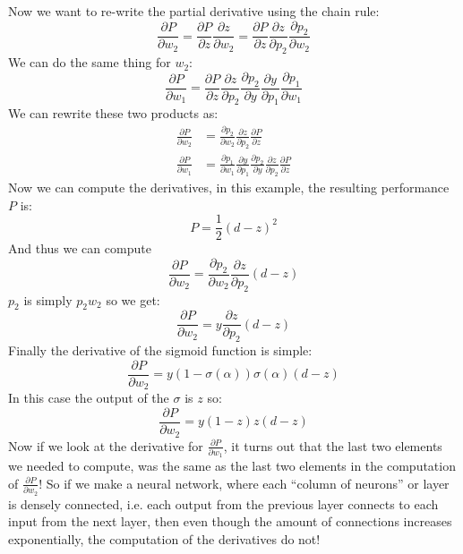     Now we want to re-write the partial derivative using the chain rule:
    \begin{equation*}
        \frac{\partial P}{\partial w_2} = \frac{\partial P}{\partial z} 
        \frac{\partial z}{\partial w_2} = \frac{\partial P}{\partial z} 
        \frac{\partial z}{\partial p_2} \frac{\partial p_2}{\partial w_2} 
    \end{equation*}
    We can do the same thing for $w_2$:
    \begin{equation*}
        \frac{\partial P}{\partial w_1} = \frac{\partial P}{\partial z} 
        \frac{\partial z}{\partial p_2} \frac{\partial p_2}{\partial y} 
        \frac{\partial y}{\partial p_1} \frac{\partial p_1}{\partial w_1} 
    \end{equation*}
    We can rewrite these two products as:
    \begin{align*}
        \frac{\partial P}{\partial w_2}&= \frac{\partial p_2}{\partial w_2} 
        \frac{\partial z}{\partial p_2} \frac{\partial P}{\partial z}\\
        \frac{\partial P}{\partial w_1}&=\frac{\partial p_1}{\partial w_1} 
        \frac{\partial y}{\partial p_1} \frac{\partial p_2}{\partial y} 
        \frac{\partial z}{\partial p_2} \frac{\partial P}{\partial z}
    \end{align*}
    Now we can compute the derivatives, in this example, the resulting 
    performance $P$ is: 
    \begin{equation*}
    P=\frac{1}{2}(d-z)^2
    \end{equation*}
    And thus we can compute
    \begin{equation*}
        \frac{\partial P}{\partial w_2}= \frac{\partial p_2}{\partial w_2} 
        \frac{\partial z}{\partial p_2} (d-z)
    \end{equation*}
    $p_2$ is simply $p_2 w_2$ so we get:
    \begin{equation*}
        \frac{\partial P}{\partial w_2}= y 
        \frac{\partial z}{\partial p_2} (d-z)
    \end{equation*}
    Finally the derivative of the sigmoid function is simple:
    \begin{equation*}
    \frac{\partial P}{\partial w_2}= y 
    (1-\sigma(\alpha))\sigma(\alpha) (d-z)
    \end{equation*}
    In this case the output of the $\sigma$ is $z$ so:
    \begin{equation*}
    \frac{\partial P}{\partial w_2}= y 
    (1-z)z (d-z)
    \end{equation*}
    Now if we look at the derivative for $\frac{\partial P}{\partial w_1}$, it 
    turns out that the last two elements we needed to compute, was the same as 
    the last two elements in the computation of $\frac{\partial P}{\partial 
    w_2}$! So if we make a neural network, where each ``column of neurons'' or 
    layer is densely connected, i.e. each output from the previous layer 
    connects to each input from the next layer, then even though the amount of 
    connections increases exponentially, the computation of the derivatives do 
    not! 
    
